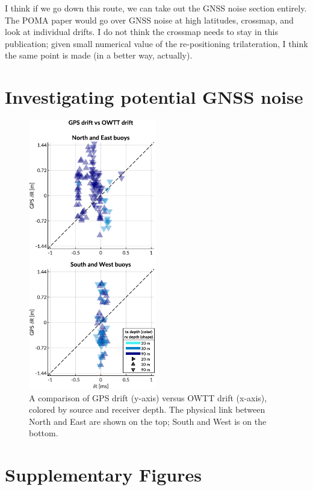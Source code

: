 I think if we go down this route, we can take out the GNSS noise section entirely. The POMA paper would go over GNSS noise at high latitudes, crossmap, and look at individual drifts. I do not think the crossmap needs to stay in this publication; given small numerical value of the re-positioning trilateration, I think the same point is made (in a better way, actually).

\clearpage
\section{Investigating potential GNSS noise}

\begin{figure}[h!]
	\centering
	\includegraphics[width=\reprintcolumnwidth]{figs/Fig8.pdf} 
	\caption{A comparison of GPS drift (y-axis) versus OWTT drift (x-axis), colored by source and receiver depth. The physical link between North and East are shown on the top; South and West is on the bottom.}
	\label{fig:gps-drift-example}
\end{figure}

\clearpage
\section*{Supplementary Figures}

